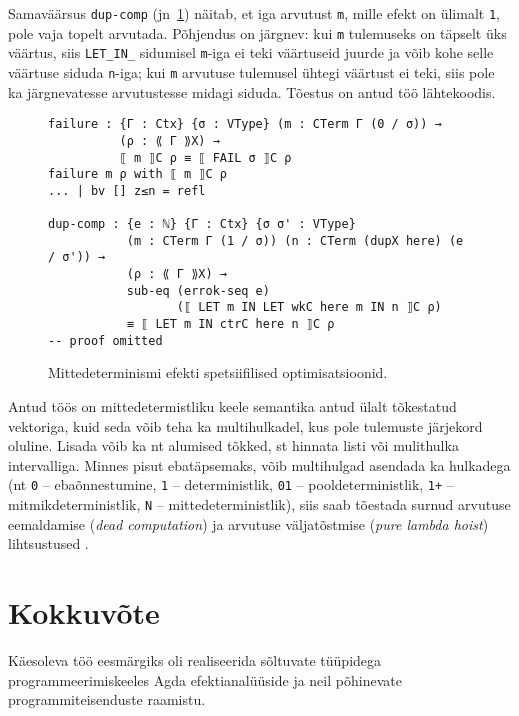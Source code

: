 \documentclass[a4paper,12pt]{article}
\begin{document}
Samaväärsus {\tt dup-comp} (jn~\ref{fig:nd.opt2}) näitab, et iga arvutust {\tt m}, mille efekt on ülimalt {\tt 1}, pole vaja topelt arvutada. Põhjendus on järgnev: kui {\tt m} tulemuseks on täpselt üks väärtus, siis {\tt LET_IN_} sidumisel {\tt m}-iga ei teki väärtuseid juurde ja võib kohe selle väärtuse siduda {\tt n}-iga; kui {\tt m} arvutuse tulemusel ühtegi väärtust ei teki, siis pole ka järgnevatesse arvutustesse midagi siduda. Tõestus on antud töö lähtekoodis.
\begin{figure}
  \begin{BVerbatim}
failure : {Γ : Ctx} {σ : VType} (m : CTerm Γ (0 / σ)) →
          (ρ : ⟪ Γ ⟫X) → 
          ⟦ m ⟧C ρ ≡ ⟦ FAIL σ ⟧C ρ
failure m ρ with ⟦ m ⟧C ρ
... | bv [] z≤n = refl

dup-comp : {e : ℕ} {Γ : Ctx} {σ σ' : VType} 
           (m : CTerm Γ (1 / σ)) (n : CTerm (dupX here) (e / σ')) →
           (ρ : ⟪ Γ ⟫X) → 
           sub-eq (errok-seq e)
                  (⟦ LET m IN LET wkC here m IN n ⟧C ρ)
           ≡ ⟦ LET m IN ctrC here n ⟧C ρ
-- proof omitted
  \end{BVerbatim}
  \caption{Mittedeterminismi efekti spetsiifilised optimisatsioonid.}
  \label{fig:nd.opt2}
\end{figure}

Antud töös on mittedetermistliku keele semantika antud ülalt tõkestatud vektoriga,
kuid seda võib teha ka multihulkadel, kus pole tulemuste järjekord oluline.
Lisada võib ka nt alumised tõkked, st hinnata listi või mulithulka intervalliga.
Minnes pisut ebatäpsemaks, võib multihulgad asendada ka hulkadega (nt {\tt 0} -- ebaõnnestumine, {\tt 1} -- deterministlik, {\tt 01} -- pooldeterministlik, {\tt 1+} -- mitmikdeterministlik, {\tt N} -- mittedeterministlik), siis saab tõestada surnud arvutuse eemaldamise (\emph{dead computation}) ja arvutuse väljatõstmise (\emph{pure lambda hoist}) lihtsustused \cite{Benton2016}.

\clearpage\vspace*{0pt}


\section{Kokkuvõte}

Käesoleva töö eesmärgiks oli realiseerida sõltuvate tüüpidega programmeerimiskeeles Agda efektianalüüside ja neil põhinevate programmiteisenduste raamistu.
\end{document}
